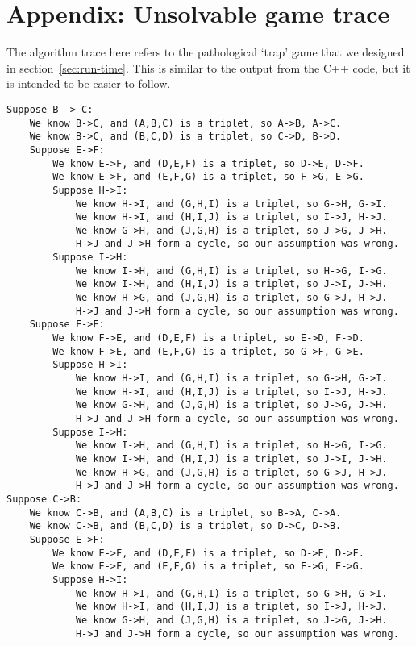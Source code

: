\documentclass[12pt,x11names, rgb]{article}
\begin{document}
\section{Appendix: Unsolvable game trace}
\label{appendix:worst-case}
The algorithm trace here refers to the pathological `trap' game that we designed in section~\ref{sec:run-time}. This is similar to the output from the C++ code, but it is intended to be easier to follow.
   \begin{verbatim}
Suppose B -> C:
    We know B->C, and (A,B,C) is a triplet, so A->B, A->C.
    We know B->C, and (B,C,D) is a triplet, so C->D, B->D.
    Suppose E->F:
        We know E->F, and (D,E,F) is a triplet, so D->E, D->F.
        We know E->F, and (E,F,G) is a triplet, so F->G, E->G.
        Suppose H->I:
            We know H->I, and (G,H,I) is a triplet, so G->H, G->I.
            We know H->I, and (H,I,J) is a triplet, so I->J, H->J.
            We know G->H, and (J,G,H) is a triplet, so J->G, J->H.
            H->J and J->H form a cycle, so our assumption was wrong.
        Suppose I->H:
            We know I->H, and (G,H,I) is a triplet, so H->G, I->G.
            We know I->H, and (H,I,J) is a triplet, so J->I, J->H.
            We know H->G, and (J,G,H) is a triplet, so G->J, H->J.
            H->J and J->H form a cycle, so our assumption was wrong.
    Suppose F->E:
        We know F->E, and (D,E,F) is a triplet, so E->D, F->D.
        We know F->E, and (E,F,G) is a triplet, so G->F, G->E.
        Suppose H->I:
            We know H->I, and (G,H,I) is a triplet, so G->H, G->I.
            We know H->I, and (H,I,J) is a triplet, so I->J, H->J.
            We know G->H, and (J,G,H) is a triplet, so J->G, J->H.
            H->J and J->H form a cycle, so our assumption was wrong.
        Suppose I->H:
            We know I->H, and (G,H,I) is a triplet, so H->G, I->G.
            We know I->H, and (H,I,J) is a triplet, so J->I, J->H.
            We know H->G, and (J,G,H) is a triplet, so G->J, H->J.
            H->J and J->H form a cycle, so our assumption was wrong.
Suppose C->B:
    We know C->B, and (A,B,C) is a triplet, so B->A, C->A.
    We know C->B, and (B,C,D) is a triplet, so D->C, D->B.
    Suppose E->F:
        We know E->F, and (D,E,F) is a triplet, so D->E, D->F.
        We know E->F, and (E,F,G) is a triplet, so F->G, E->G.
        Suppose H->I:
            We know H->I, and (G,H,I) is a triplet, so G->H, G->I.
            We know H->I, and (H,I,J) is a triplet, so I->J, H->J.
            We know G->H, and (J,G,H) is a triplet, so J->G, J->H.
            H->J and J->H form a cycle, so our assumption was wrong.

\end{verbatim}
\end{document}
